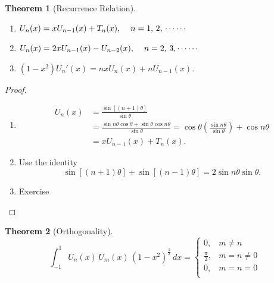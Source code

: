 \documentclass[12pt,a4paper]{report}
\theoremstyle{definition}
\newtheorem{thm}{Theorem}[section]
\theoremstyle{plain}
\begin{document}
\begin{thm}[Recurrence Relation]\textbf{}
\vspace*{-6mm}
\begin{enumerate}
\item[(a).] $U_n(x) = x U_{n-1}(x) + T_n(x), \hspace{0.4cm} n = 1, \, 2, \, \cdots\cdots$
\item[(b).] $U_n(x) = 2x U_{n - 1}(x) - U_{n-2}(x), \hspace{0.4cm} n = 2, \, 3, \cdots\cdots$
\item[(c).] $(1 - x^2)U_n'(x) = nx U_n(x) + nU_{n-1}(x).$
\end{enumerate}
\end{thm}






\begin{proof}
\begin{enumerate}
\item[(a).] 
\begin{align*}
U_n(x) & = \frac{\sin [(n + 1)\theta]}{\sin \theta}\\
       & = \frac{\sin n\theta \cos \theta + \sin \theta \cos n\theta}{\sin \theta}
         = \cos \theta\left(\frac{\sin n\theta}{\sin \theta}\right) + \cos n\theta\\
       & = xU_{n-1}(x) + T_n(x).
\end{align*}

\item[(b).] Use the identity
$$\sin[(n+1)\theta] + \sin[(n - 1)\theta] = 2\sin n\theta \sin \theta.$$

\item[(c).] Exercise
\end{enumerate}
\end{proof}




\begin{thm}[Orthogonality]
$$\int_{-1}^1U_n(x)\, U_m(x)\, (1 - x^2)^{\frac{1}{2}}\, dx = \begin{cases}
                                                               0, & m\neq n\\
                                                               \frac{\pi}{2}, & m=n\neq 0\\
                                                               0, & m = n= 0\\
                                                              \end{cases}$$
\end{thm}
\end{document}
